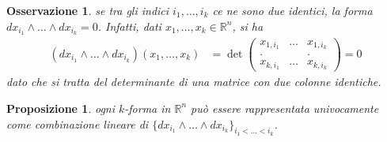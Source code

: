 \documentclass[twoside, 11pt]{amsbook}
\newcommand{\0}{{(0)}}
\newcommand{\3}{{(3)}}
\theoremstyle{colonplain}
\newtheorem{prop}[thm]{Proposizione}
\theoremstyle{colondefinition}
\theoremstyle{colonremark}
\newtheorem{rmk}[thm]{Osservazione}
\numberwithin{equation}{chapter}
\begin{document}
\begin{rmk} se tra gli indici $i_1, \dots, i_k$ ce ne sono due identici, la forma $dx_{i_1} \wedge \dots \wedge dx_{i_k} = 0$. Infatti, dati $x_1, \dots, x_k \in \mathbb{R}^n$, si ha 
\begin{align}
    (dx_{i_1} \wedge \dots \wedge dx_{i_k})(x_1, \dots, x_k) &= \det
    \begin{pmatrix}
        x_{1, i_1} & \dots & x_{1, i_k} \\
        . & & . \\
        x_{k, i_1} & \dots & x_{k, i_k}
    \end{pmatrix} = 0 
\end{align}
dato che si tratta del determinante di una matrice con due colonne identiche.
\end{rmk}
\begin{prop}\label{UniqueReprExtForm} ogni $k$-forma in $\mathbb{R}^n$ può essere rappresentata univocamente come combinazione lineare di $\{dx_{i_1} \wedge \dots \wedge dx_{i_k}\}_{i_1 < \dots < i_k}$.
\end{prop}
\end{document}
